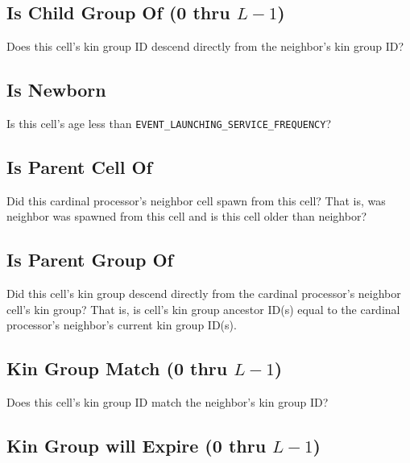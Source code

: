 \subsection{Is Child Group Of (0 thru $L-1$)}


Does this cell's kin group ID descend directly from the neighbor's kin group ID?

\subsection{Is Newborn}


Is this cell's age less than \texttt{EVENT\_LAUNCHING\_SERVICE\_FREQUENCY}?

\subsection{Is Parent Cell Of}


Did this cardinal processor's neighbor cell spawn from this cell?
That is, was neighbor was spawned from this cell and is this cell older than neighbor?

\subsection{Is Parent Group Of}


Did this cell's kin group descend directly from the cardinal processor's neighbor cell's kin group?
That is, is cell's kin group ancestor ID(s) equal to the cardinal processor's neighbor's current kin group ID(s).

\subsection{Kin Group Match (0 thru $L-1$)}


Does this cell's kin group ID match the neighbor's kin group ID?

\subsection{Kin Group will Expire (0 thru $L-1$)}

